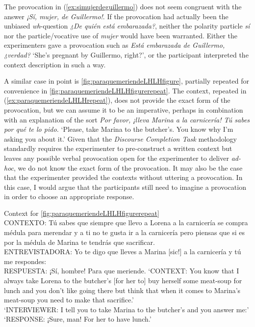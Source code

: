 The provocation in (\ref{ex:simujerdeguillermo}) does not seem congruent with the answer \textit{¡Sí, mujer, de Guillermo!}. If the provocation had actually been the unbiased \textit{wh}-question \textit{¿De quién está embarazada?}, neither the polarity particle \textit{sí} nor the particle/vocative use of \textit{mujer} would have been warranted. Either the experimenters gave a provocation such as \textit{Está embarazada de Guillermo, ¿verdad?} `She's pregnant by Guillermo, right?', or the participant interpreted the context description in such a way.

A similar case in point is \autoref{fig:paraquemeriendeLHLHfigure}, partially repeated for convenience in \autoref{fig:paraquemeriendeLHLHfigurerepeat}. The context, repeated in (\ref{ex:paraquemeriendeLHLHrepeat}), does not provide the exact form of the provocation, but we can assume it to be an imperative, perhaps in combination with an explanation of the sort \textit{Por favor, ¡lleva Marina a la carnicería! Tú sabes por qué te lo pido.} `Please, take Marina to the butcher's. You know why I'm asking you about it.' Given that the \textit{Discourse Completion Task} methodology \citep{VanrellFeldhausenAstruc.2018} standardly requires the experimenter to pre-construct a written context but leaves any possible verbal provocation open for the experimenter to deliver \textit{ad-hoc}, we do not know the exact form of the provocation. It may also be the case that the experimenter provided the contexts without uttering a provocation. In this case, I would argue that the participants still need to imagine a provocation in order to choose an appropriate response.

\begin{exe}
\ex \label{ex:paraquemeriendeLHLHrepeat}  Context for \autoref{fig:paraquemeriendeLHLHfigurerepeat}\\
	CONTEXTO: Tú sabes que siempre que llevo a Lorena a la carnicería se compra médula para merendar y a ti no te gusta ir a la carnicería pero piensas que si es por la médula de Marina te tendrás que sacrificar.\\
	ENTREVISTADORA: Yo te digo que lleves a Marina [sic!] a la carnicería y tú me respondes:\\
	RESPUESTA: ¡Sí, hombre! Para que meriende.
	\glt `CONTEXT: You know that I always take Lorena to the butcher's [for her to] buy herself some meat-soup for lunch and you don't like going there but think that when it comes to Marina's meat-soup you need to make that sacrifice.' \\
	`INTERVIEWER: I tell you to take Marina to the butcher's and you answer me:' \\
	`RESPONSE:	¡Sure, man! For her to have lunch.'
\end{exe}



